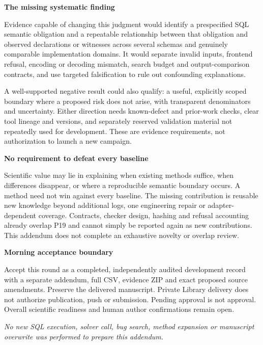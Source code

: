\documentclass[10pt]{article}
\newcommand{\head}[1]{\medskip\textbf{#1}\par}
\begin{document}
\head{The missing systematic finding}
Evidence capable of changing this judgment would identify a prespecified SQL semantic obligation and a repeatable relationship between that obligation and observed declarations or witnesses across several schemas and genuinely comparable implementation domains. It would separate invalid inputs, frontend refusal, encoding or decoding mismatch, search budget and output-comparison contracts, and use targeted falsification to rule out confounding explanations.

A well-supported negative result could also qualify: a useful, explicitly scoped boundary where a proposed risk does not arise, with transparent denominators and uncertainty. Either direction needs known-defect and prior-work checks, clear tool lineage and versions, and separately reserved validation material not repeatedly used for development. These are evidence requirements, not authorization to launch a new campaign.

\head{No requirement to defeat every baseline}
Scientific value may lie in explaining when existing methods suffice, when differences disappear, or where a reproducible semantic boundary occurs. A method need not win against every baseline. The missing contribution is reusable new knowledge beyond additional logs, one engineering repair or adapter-dependent coverage. Contracts, checker design, hashing and refusal accounting already overlap P19 and cannot simply be reported again as new contributions. This addendum does not complete an exhaustive novelty or overlap review.

\head{Morning acceptance boundary}
Accept this round as a completed, independently audited development record with a separate addendum, full CSV, evidence ZIP and exact proposed source amendments. Preserve the delivered manuscript. Private Library delivery does not authorize publication, push or submission. Pending approval is not approval. Overall scientific readiness and human author confirmations remain open.

\smallskip
\textit{No new SQL execution, solver call, bug search, method expansion or manuscript overwrite was performed to prepare this addendum.}
\end{document}
